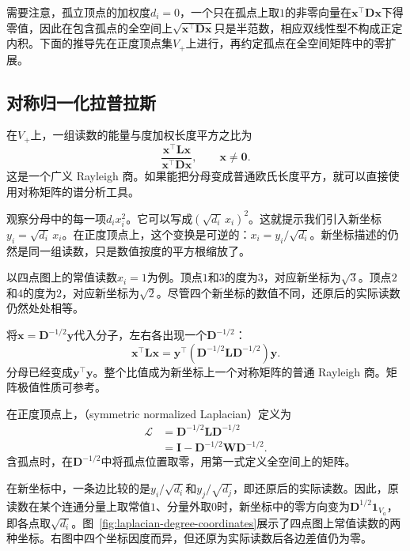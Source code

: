需要注意，孤立顶点的加权度$d_i=0$，一个只在孤点上取$1$的非零向量在$\bm x^\top\bm D\bm x$下得零值，因此在包含孤点的全空间上$\sqrt{\bm x^\top\bm D\bm x}$只是半范数，相应双线性型不构成正定内积。下面的推导先在正度顶点集$V_+$上进行，再约定孤点在全空间矩阵中的零扩展。

\subsection{对称归一化拉普拉斯}
\label{sec:graph-symmetric-normalized-laplacian}

在$V_+$上，一组读数的能量与度加权长度平方之比为
\[
  \frac{\bm x^\top\bm L\bm x}{\bm x^\top\bm D\bm x},
  \qquad \bm x\ne\bm0.
\]
这是一个广义 Rayleigh 商。如果能把分母变成普通欧氏长度平方，就可以直接使用对称矩阵的谱分析工具。

观察分母中的每一项$d_ix_i^2$。它可以写成$(\sqrt{d_i}\,x_i)^2$。这就提示我们引入新坐标$y_i=\sqrt{d_i}\,x_i$。在正度顶点上，这个变换是可逆的：$x_i=y_i/\sqrt{d_i}$。新坐标描述的仍然是同一组读数，只是数值按度的平方根缩放了。

以四点图上的常值读数$x_i=1$为例。顶点$1$和$3$的度为$3$，对应新坐标为$\sqrt3$。顶点$2$和$4$的度为$2$，对应新坐标为$\sqrt2$。尽管四个新坐标的数值不同，还原后的实际读数仍然处处相等。

将$\bm x=\bm D^{-1/2}\bm y$代入分子，左右各出现一个$\bm D^{-1/2}$：
\[
  \bm x^\top\bm L\bm x
  =\bm y^\top(\bm D^{-1/2}\bm L\bm D^{-1/2})\bm y.
\]
分母已经变成$\bm y^\top\bm y$。整个比值成为新坐标上一个对称矩阵的普通 Rayleigh 商。矩阵极值性质可参考。

\begin{definition}[对称归一化拉普拉斯]
\label{def:graph-symmetric-normalized-laplacian}
在正度顶点上，（symmetric normalized Laplacian）定义为
\begin{equation}
  \begin{aligned}
  \mathcal L&=\bm D^{-1/2}\bm L\bm D^{-1/2}\\
            &=\bm I-\bm D^{-1/2}\bm W\bm D^{-1/2}.
  \end{aligned}
  \label{eq:graph-symmetric-normalized-laplacian}
\end{equation}
含孤点时，在$\bm D^{-1/2}$中将孤点位置取零，用第一式定义全空间上的矩阵。
\end{definition}

在新坐标中，一条边比较的是$y_i/\sqrt{d_i}$和$y_j/\sqrt{d_j}$，即还原后的实际读数。因此，原读数在某个连通分量上取常值$1$、分量外取$0$时，新坐标中的零方向变为$\bm D^{1/2}\bm1_{V_a}$，即各点取$\sqrt{d_i}$。图~\ref{fig:laplacian-degree-coordinates}展示了四点图上常值读数的两种坐标。右图中四个坐标因度而异，但还原为实际读数后各边差值仍为零。

